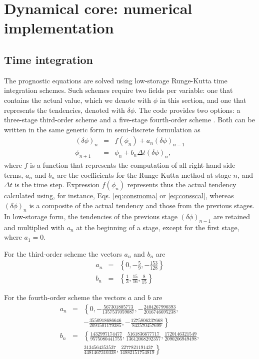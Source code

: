 \documentclass[gmd]{copernicus}
\begin{document}
\section{Dynamical core: numerical implementation}\label{sec:dyncorediscrete}
\subsection{Time integration}
The prognostic equations are solved using low-storage Runge-Kutta time integration schemes. Such schemes require two fields per variable: one that contains the actual value, which we denote with $\phi$ in this section, and one that represents the tendencies, denoted with $\delta \phi$. The code provides two options: a three-stage third-order scheme \citep{Williamson1980} and a five-stage fourth-order scheme \citep{Carpenter1994}. Both can be written in the same generic form in semi-discrete formulation as
\begin{eqnarray}
\left( \delta \phi \right)_n & = & f \left( \phi_n \right) + a_n \left( \delta \phi \right)_{n-1} \\
\phi_{n+1} & = & \phi_n + b_n \Delta t \left( \delta \phi \right)_{n},
\end{eqnarray}
where $f$ is a function that represents the computation of all right-hand side terms, $a_n$ and $b_n$ are the coefficients for the Runge-Kutta method at stage $n$, and $\Delta t$ is the time step. Expression $f \left( \phi_n \right)$ represents thus the actual tendency calculated using, for instance, Eqs. \ref{eq:consmoma} or \ref{eq:consscal}, whereas $(\delta \phi)_n$ is a composite of the actual tendency and those from the previous stages. In low-storage form, the tendencies of the previous stage $\left( \delta \phi \right)_{n-1}$ are retained and multiplied with $a_n$ at the beginning of a stage, except for the first stage, where $a_1 = 0$. 

For the third-order scheme the vectors $a_n$ and $b_n$ are
\begin{eqnarray}
a_n & = & \left\{0, -\frac{5}{9}, -\frac{153}{128} \right\}\\
b_n & = & \left\{\frac{1}{3}, \frac{15}{16}, \frac{8}{15} \right\}
\end{eqnarray}

For the fourth-order scheme the vectors $a$ and $b$ are
\begin{eqnarray}
\nonumber a_n & = & \left\{0, -\frac{567301805773}{1357537059087},
-\frac{2404267990393}{2016746695238},\right.\\
& & \left. -\frac{3550918686646}{2091501179385},
-\frac{1275806237668}{842570457699} \right\}\\
\nonumber b_n & = & \left\{\frac{1432997174477}{9575080441755}, \frac{5161836677717}{13612068292357},
\frac{1720146321549}{2090206949498},\right.\\
& & \left. \frac{3134564353537}{4481467310338},
\frac{2277821191437}{14882151754819} \right\}
\end{eqnarray}
\end{document}
